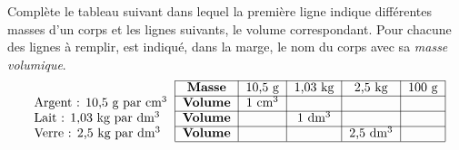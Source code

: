 Complète le tableau suivant dans lequel la première ligne indique
différentes masses d'un corps et les lignes suivants, le volume
correspondant. Pour chacune des lignes à remplir, est indiqué, dans la
marge, le nom du corps avec sa {\em masse volumique}.
\renewcommand{\arraystretch}{1.5}
\[
\begin{tabular}{l|c|c|c|c|c|}
\cline{2-6}
&{\bf Masse}&10,5~g&1,03~kg&2,5~kg&100~g\\
\cline{2-6}
Argent : 10,5~g par cm$^3$&{\bf Volume}&1~cm$^3$&&&\\
\cline{2-6}
Lait : 1,03~kg par dm$^3$&{\bf Volume}&&1~dm$^3$&&\\
\cline{2-6}
Verre : 2,5~kg par dm$^3$&{\bf Volume}&&&2,5~dm$^3$&\\
\cline{2-6}
\end{tabular}
\]
\renewcommand{\arraystretch}{1}

